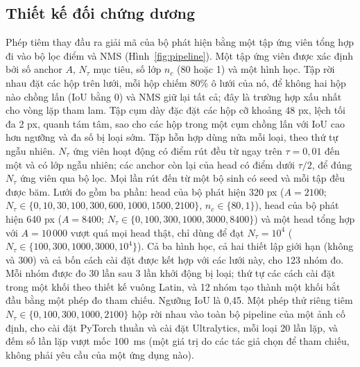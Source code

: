 \documentclass[a4paper,fleqn]{cas-dc}
\newcommand{\Ntau}{N_{\tau}}
\begin{document}
\subsection{Thiết kế đối chứng dương}
Phép tiêm thay đầu ra giải mã của bộ phát hiện bằng một tập ứng viên tổng hợp đi vào bộ lọc điểm và NMS (Hình~\ref{fig:pipeline}). Một tập ứng viên được xác định bởi số anchor $A$, $\Ntau$ mục tiêu, số lớp $n_c$ (80 hoặc 1) và một hình học. Tập rời nhau đặt các hộp trên lưới, mỗi hộp chiếm 80\% ô lưới của nó, để không hai hộp nào chồng lấn (IoU bằng 0) và NMS giữ lại tất cả; đây là trường hợp xấu nhất cho vòng lặp tham lam. Tập cụm dày đặc đặt các hộp cỡ khoảng 48 px, lệch tối đa 2 px, quanh tám tâm, sao cho các hộp trong một cụm chồng lấn với IoU cao hơn ngưỡng và đa số bị loại sớm. Tập hỗn hợp dùng nửa mỗi loại, theo thứ tự ngẫu nhiên. $\Ntau$ ứng viên hoạt động có điểm rút đều từ ngay trên $\tau=0{,}01$ đến một và có lớp ngẫu nhiên; các anchor còn lại của head có điểm dưới $\tau/2$, để đúng $\Ntau$ ứng viên qua bộ lọc. Mọi lần rút đến từ một bộ sinh có seed và mỗi tập đều được băm. Lưới đo gồm ba phần: head của bộ phát hiện 320 px ($A=2100$; $\Ntau\in\{0,10,30,100,300,600,1000,1500,2100\}$, $n_c\in\{80,1\}$), head của bộ phát hiện 640 px ($A=8400$; $\Ntau\in\{0,100,300,1000,3000,8400\}$) và một head tổng hợp với $A=10\,000$ vượt quá mọi head thật, chỉ dùng để đạt $\Ntau=10^4$ ($\Ntau\in\{100,300,1000,3000,10^4\}$). Cả ba hình học, cả hai thiết lập giới hạn (không và 300) và cả bốn cách cài đặt được kết hợp với các lưới này, cho 123 nhóm đo. Mỗi nhóm được đo 30 lần sau 3 lần khởi động bị loại; thứ tự các cách cài đặt trong một khối theo thiết kế vuông Latin, và 12 nhóm tạo thành một khối bắt đầu bằng một phép đo tham chiếu. Ngưỡng IoU là 0,45. Một phép thử riêng tiêm $\Ntau\in\{0,100,300,1000,2100\}$ hộp rời nhau vào toàn bộ pipeline của một ảnh cố định, cho cài đặt PyTorch thuần và cài đặt Ultralytics, mỗi loại 20 lần lặp, và đếm số lần lặp vượt mốc 100~ms (một giá trị do các tác giả chọn để tham chiếu, không phải yêu cầu của một ứng dụng nào).
\end{document}

